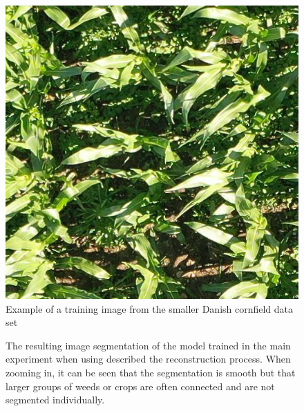 \documentclass{article}
\begin{document}
\begin{figure}[h!]
	\centering
	\includegraphics[width=0.7\linewidth]{"corn.JPG"}
	\caption{Example of a training image from the smaller Danish cornfield data set}
	\label{fig:corn}
\end{figure}


\begin{figure}[h!]
	\centering
	\caption{The resulting image segmentation of the model trained in the main experiment when using described the reconstruction process. When zooming in, it can be seen that the segmentation is smooth but that larger groups of weeds or crops are often connected and are not segmented individually. }
	\label{fig:inf}
\end{figure}
\end{document}
